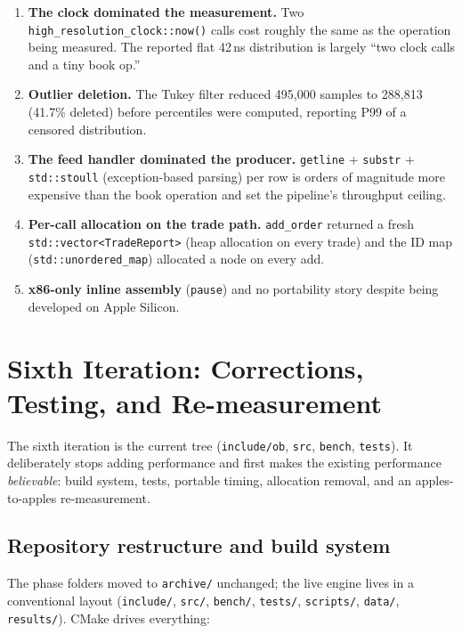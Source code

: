 \documentclass[11pt,a4paper]{article}
\begin{document}
\begin{enumerate}
\item \textbf{The clock dominated the measurement.} Two
      \texttt{high\_resolution\_clock::now()} calls cost roughly the same
      as the operation being measured. The reported flat 42\,ns distribution
      is largely ``two clock calls and a tiny book op.''
\item \textbf{Outlier deletion.} The Tukey filter reduced 495{,}000 samples
      to 288{,}813 (41.7\% deleted) before percentiles were computed,
      reporting P99 of a censored distribution.
\item \textbf{The feed handler dominated the producer.} \texttt{getline} +
      \texttt{substr} + \texttt{std::stoull} (exception-based parsing) per
      row is orders of magnitude more expensive than the book operation and
      set the pipeline's throughput ceiling.
\item \textbf{Per-call allocation on the trade path.} \texttt{add\_order}
      returned a fresh \texttt{std::vector<TradeReport>} (heap allocation
      on every trade) and the ID map (\texttt{std::unordered\_map})
      allocated a node on every add.
\item \textbf{x86-only inline assembly} (\texttt{pause}) and no portability
      story despite being developed on Apple Silicon.
\end{enumerate}

\section{Sixth Iteration: Corrections, Testing, and
Re-measurement}\label{sec:sixth}

The sixth iteration is the current tree (\texttt{include/ob}, \texttt{src},
\texttt{bench}, \texttt{tests}). It deliberately stops adding performance
and first makes the existing performance \emph{believable}: build system,
tests, portable timing, allocation removal, and an apples-to-apples
re-measurement.

\subsection{Repository restructure and build system}

The phase folders moved to \texttt{archive/} unchanged; the live engine
lives in a conventional layout (\texttt{include/}, \texttt{src/},
\texttt{bench/}, \texttt{tests/}, \texttt{scripts/}, \texttt{data/},
\texttt{results/}). CMake drives everything:
\end{document}
